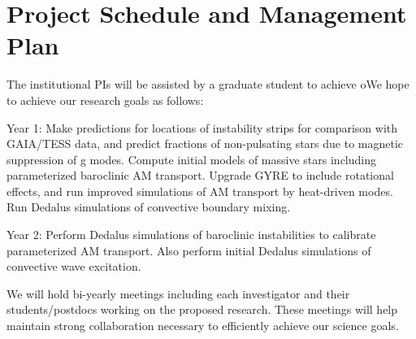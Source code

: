 \section{Project Schedule and Management Plan}

The institutional PIs will be assisted by a graduate student to achieve oWe hope to achieve our research goals as follows:

Year 1: Make predictions for locations of instability strips for comparison with GAIA/TESS data, and predict fractions of non-pulsating stars due to magnetic suppression of g modes. Compute initial models of massive stars including parameterized baroclinic AM transport. Upgrade GYRE to include rotational effects, and run improved simulations of AM transport by heat-driven modes. Run Dedalus simulations of convective boundary mixing.

Year 2: Perform Dedalus simulations of baroclinic instabilities to calibrate parameterized AM transport. Also perform initial Dedalus simulations of convective wave excitation. 

We will  hold bi-yearly meetings including each investigator and their students/postdocs working on the proposed research. These meetings will help maintain strong collaboration necessary to efficiently achieve our science goals.
